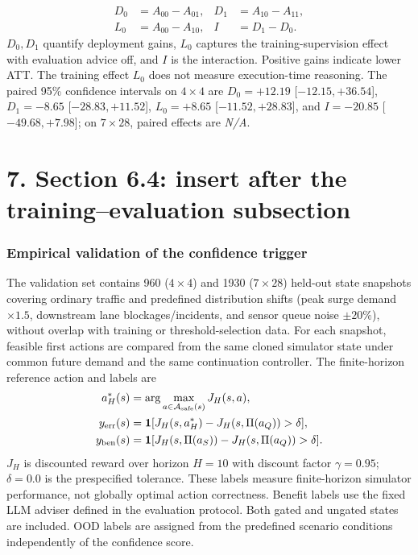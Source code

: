 \documentclass[10pt]{article}
\newcommand{\NA}{\textit{N/A}}
\begin{document}
\begin{align}
D_0 &= A_{00}-A_{01}, & D_1 &= A_{10}-A_{11},\\
L_0 &= A_{00}-A_{10}, & I &= D_1-D_0.
\end{align}
$D_0,D_1$ quantify deployment gains, $L_0$ captures the training-supervision
effect with evaluation advice off, and $I$ is the interaction. Positive gains
indicate lower ATT. The training effect $L_0$ does not measure execution-time
reasoning. The paired 95\% confidence intervals on $4\times4$ are
$D_0 = +12.19$ [$-12.15, +36.54$],
$D_1 = -8.65$ [$-28.83, +11.52$],
$L_0 = +8.65$ [$-11.52, +28.83$], and
$I = -20.85$ [$-49.68, +7.98$]; on $7\times28$, paired effects are \NA.

\section*{7. Section 6.4: insert after the training--evaluation subsection}
\subsubsection{Empirical validation of the confidence trigger}
The validation set contains 960 ($4\times4$) and 1930 ($7\times28$) held-out state snapshots covering ordinary
traffic and predefined distribution shifts (peak surge demand $\times 1.5$, downstream lane blockages/incidents, and sensor queue noise $\pm 20\%$), without overlap with training
or threshold-selection data. For each snapshot, feasible first actions are compared
from the same cloned simulator state under common future demand and the same
continuation controller. The finite-horizon reference action and labels are
\begin{align}
a_H^*(s)&=\arg\max_{a\in\mathcal A_{\rm safe}(s)}J_H(s,a),\\
y_{\rm err}(s)&=\mathbf{1}[J_H(s,a_H^*)-J_H(s,\Pi(a_Q))>\delta],\\
y_{\rm ben}(s)&=\mathbf{1}[J_H(s,\Pi(a_S))-J_H(s,\Pi(a_Q))>\delta].
\end{align}
$J_H$ is discounted reward over horizon $H=10$ with discount factor
$\gamma=0.95$; $\delta=0.0$ is the prespecified tolerance. These labels measure finite-horizon simulator
performance, not globally optimal action correctness. Benefit labels use the fixed
LLM adviser defined in the evaluation protocol. Both gated and ungated states
are included. OOD labels are assigned from the predefined scenario conditions
independently of the confidence score.
\end{document}
